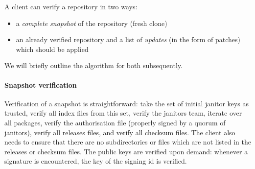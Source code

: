 \documentclass[nocopyrightspace]{sigplanconf}
\begin{document}
A client can verify a repository in two ways:
\begin{itemize}
  \item a \emph{complete snapshot} of the repository (fresh clone)
  \item an already verified repository and a list of \emph{updates} (in the form of patches) which should be applied
\end{itemize}

We will briefly outline the algorithm for both subsequently.

\paragraph{Snapshot verification}  Verification of a snapshot is straightforward: take the set of initial janitor keys as trusted, verify all index files from this set, verify the janitors team, iterate over all packages, verify the authorisation file (properly signed by a quorum of janitors), verify all releases files, and verify all checksum files.
The client also needs to ensure that there are no subdirectories or files which are not listed in the releases or checksum files.
The public keys are verified upon demand: whenever a signature is encountered, the key of the signing id is verified.
\end{document}
